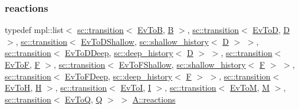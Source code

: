 \subsubsection{\texorpdfstring{reactions}{reactions}\hspace{0.1cm}{\footnotesize\ttfamily [10/13]}}
{\footnotesize\ttfamily typedef mpl\+::list$<$ \mbox{\hyperlink{classboost_1_1statechart_1_1transition}{sc\+::transition}}$<$ \mbox{\hyperlink{struct_ev_to_b}{Ev\+ToB}}, \mbox{\hyperlink{struct_b}{B}} $>$, \mbox{\hyperlink{classboost_1_1statechart_1_1transition}{sc\+::transition}}$<$ \mbox{\hyperlink{struct_ev_to_d}{Ev\+ToD}}, \mbox{\hyperlink{struct_d}{D}} $>$, \mbox{\hyperlink{classboost_1_1statechart_1_1transition}{sc\+::transition}}$<$ \mbox{\hyperlink{struct_ev_to_d_shallow}{Ev\+To\+D\+Shallow}}, \mbox{\hyperlink{classboost_1_1statechart_1_1shallow__history}{sc\+::shallow\+\_\+history}}$<$ \mbox{\hyperlink{struct_d}{D}} $>$ $>$, \mbox{\hyperlink{classboost_1_1statechart_1_1transition}{sc\+::transition}}$<$ \mbox{\hyperlink{struct_ev_to_d_deep}{Ev\+To\+D\+Deep}}, \mbox{\hyperlink{classboost_1_1statechart_1_1deep__history}{sc\+::deep\+\_\+history}}$<$ \mbox{\hyperlink{struct_d}{D}} $>$ $>$, \mbox{\hyperlink{classboost_1_1statechart_1_1transition}{sc\+::transition}}$<$ \mbox{\hyperlink{struct_ev_to_f}{Ev\+ToF}}, \mbox{\hyperlink{struct_f}{F}} $>$, \mbox{\hyperlink{classboost_1_1statechart_1_1transition}{sc\+::transition}}$<$ \mbox{\hyperlink{struct_ev_to_f_shallow}{Ev\+To\+F\+Shallow}}, \mbox{\hyperlink{classboost_1_1statechart_1_1shallow__history}{sc\+::shallow\+\_\+history}}$<$ \mbox{\hyperlink{struct_f}{F}} $>$ $>$, \mbox{\hyperlink{classboost_1_1statechart_1_1transition}{sc\+::transition}}$<$ \mbox{\hyperlink{struct_ev_to_f_deep}{Ev\+To\+F\+Deep}}, \mbox{\hyperlink{classboost_1_1statechart_1_1deep__history}{sc\+::deep\+\_\+history}}$<$ \mbox{\hyperlink{struct_f}{F}} $>$ $>$, \mbox{\hyperlink{classboost_1_1statechart_1_1transition}{sc\+::transition}}$<$ \mbox{\hyperlink{struct_ev_to_h}{Ev\+ToH}}, \mbox{\hyperlink{struct_h}{H}} $>$, \mbox{\hyperlink{classboost_1_1statechart_1_1transition}{sc\+::transition}}$<$ \mbox{\hyperlink{struct_ev_to_i}{Ev\+ToI}}, \mbox{\hyperlink{struct_i}{I}} $>$, \mbox{\hyperlink{classboost_1_1statechart_1_1transition}{sc\+::transition}}$<$ \mbox{\hyperlink{struct_ev_to_m}{Ev\+ToM}}, \mbox{\hyperlink{struct_m}{M}} $>$, \mbox{\hyperlink{classboost_1_1statechart_1_1transition}{sc\+::transition}}$<$ \mbox{\hyperlink{struct_ev_to_q}{Ev\+ToQ}}, \mbox{\hyperlink{struct_q}{Q}} $>$ $>$ \mbox{\hyperlink{struct_a_aaf7ef039e669b21e19f81777afeed659}{A\+::reactions}}}

